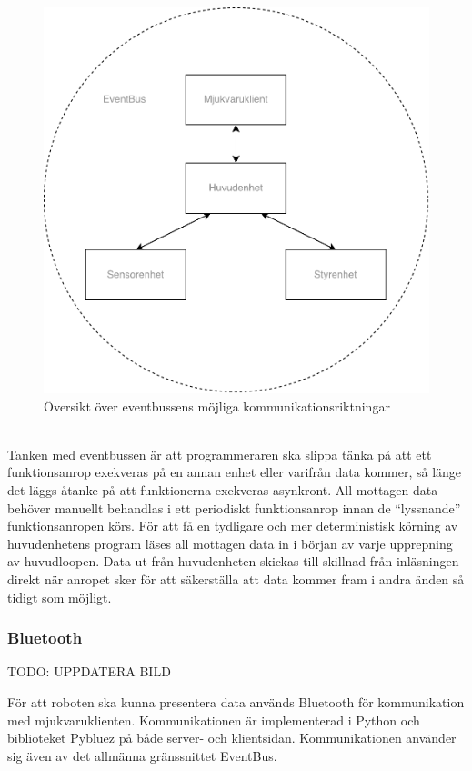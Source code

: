 \documentclass{article}
\begin{document}
\begin{figure}[H]
\centering
\includegraphics[scale=0.45]{EventBus}
\caption{Översikt över eventbussens möjliga kommunikationsriktningar}
\label{fig:eventbus_structure}
\end{figure}
\ \\
\newline
Tanken med eventbussen är att programmeraren ska slippa tänka på att ett funktionsanrop exekveras på en annan enhet eller varifrån data kommer, så länge det läggs åtanke på att funktionerna exekveras asynkront. All mottagen data behöver manuellt behandlas i ett periodiskt funktionsanrop innan de ``lyssnande'' funktionsanropen körs. För att få en tydligare och mer deterministisk körning av huvudenhetens program läses all mottagen data in i början av varje upprepning av huvudloopen. Data ut från huvudenheten skickas till skillnad från inläsningen direkt när anropet sker för att säkerställa att data kommer fram i andra änden så tidigt som möjligt.

\subsubsection{Bluetooth}
TODO: UPPDATERA BILD

För att roboten ska kunna presentera data används Bluetooth för kommunikation med mjukvaruklienten. Kommunikationen är implementerad i Python och biblioteket Pybluez på både server- och klientsidan. Kommunikationen använder sig även av det allmänna gränssnittet EventBus. 
\end{document}
